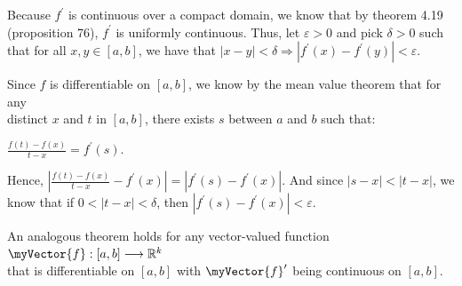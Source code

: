 \documentclass{book}
\newcommand{\pracTwo}{
   \color{Orange}%
   \fontsize{12}{14}\selectfont%
}
\newenvironment{myIndent}{%
   \begin{adjustwidth}{2.5em}{0em}%
}{%
   \end{adjustwidth}%
}
\newcommand{\retTwo}{\hfill\bigbreak}
\newcommand{\mVec}[1]{\myVector{#1}}
\begin{document}
{\begin{myIndent}\pracTwo
   Because $f^\prime$ is continuous over a compact domain, we know that by theorem 4.19\\ (proposition 76), $f^\prime$ is uniformly continuous. Thus, let $\varepsilon > 0$ and pick $\delta > 0$ such\\ that for all $x, y \in [a, b]$, we have that $|x - y| < \delta \Longrightarrow |f^\prime(x) - f^\prime(y)| < \varepsilon$.\retTwo


   Since $f$ is differentiable on $[a, b]$, we know by the mean value theorem that for any\\ distinct $x$ and $t$ in $[a, b]$, there exists $s$ between $a$ and $b$ such that:
   
   {\center$\frac{f(t) - f(x)}{t - x} = f^\prime(s)$.\retTwo\par}

   Hence, $\left|\frac{f(t) - f(x)}{t - x} - f^\prime(x)\right| = \left| f^\prime(s) - f^\prime(x)\right|$. And since $|s - x| < |t - x|$, we\\ know that if $ 0 < |t - x| < \delta$, then $|f^\prime(s) - f^\prime(x)| < \varepsilon$.\\
\end{myIndent}}

An analogous theorem holds for any vector-valued function $\mVec{f}: [a, b] \longrightarrow \mathbb{R}^k$\\ [-2pt] that is differentiable on $[a, b]$ with $\mVec{f}^\prime$ being continuous on $[a, b]$.\\ [-12pt]
\end{document}
